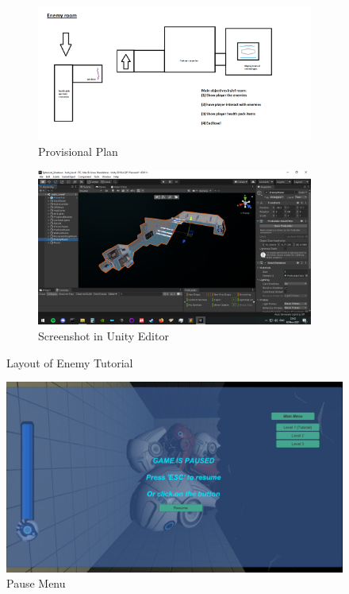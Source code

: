 \begin{figure}[H]
\centering
\begin{subfigure}{0.5\textwidth}
  \centering
  \includegraphics[width=1\linewidth]{Figures/enemyplan.png}
  \caption{Provisional Plan}
\end{subfigure}%
\begin{subfigure}{0.5\textwidth}
  \centering
  \includegraphics[width=1\linewidth]{Figures/enemy.png}
  \caption{Screenshot in Unity Editor}
\end{subfigure}
\caption{Layout of Enemy Tutorial}
\end{figure}


\begin{figure}[H]
\centering
\includegraphics[scale=0.45]{Figures/pause.png}
\caption{Pause Menu}
\end{figure}

